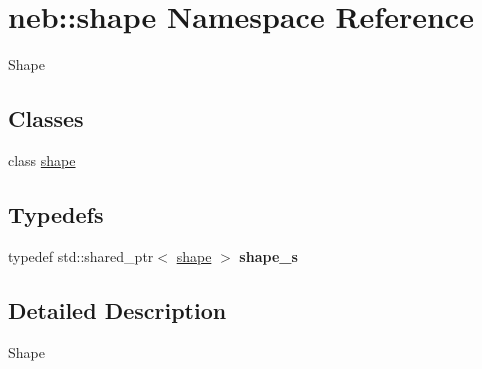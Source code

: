 \hypertarget{namespaceneb_1_1shape}{
\section{neb::shape Namespace Reference}
\label{namespaceneb_1_1shape}
}


Shape  
\subsection*{Classes}
\begin{DoxyCompactItemize}
\item 
class \hyperlink{classneb_1_1shape_1_1shape}{shape}
\end{DoxyCompactItemize}
\subsection*{Typedefs}
\begin{DoxyCompactItemize}
\item 
\hypertarget{namespaceneb_1_1shape_a58bf0011e8ddcda0407412de30baa400}{
typedef std::shared\_\-ptr$<$ \hyperlink{classneb_1_1shape_1_1shape}{shape} $>$ {\bfseries shape\_\-s}}
\label{namespaceneb_1_1shape_a58bf0011e8ddcda0407412de30baa400}

\end{DoxyCompactItemize}


\subsection{Detailed Description}
Shape 